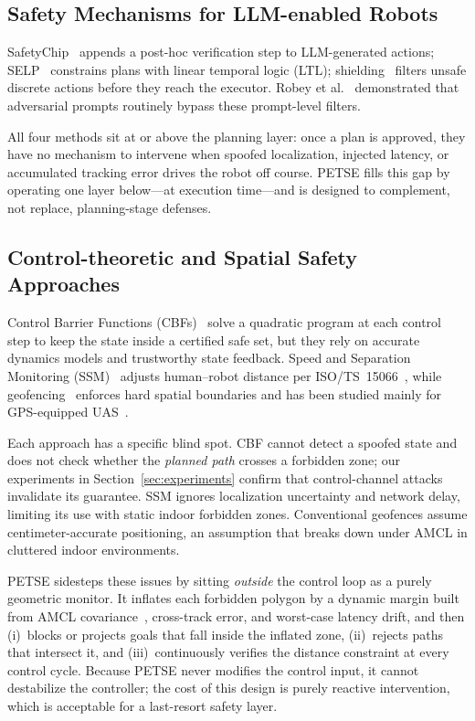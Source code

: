 \documentclass[journal,twoside,web]{ieeecolor}
\begin{document}
\subsection{Safety Mechanisms for LLM-enabled Robots}
SafetyChip~\cite{yang2024plug} appends a post-hoc verification step to LLM-generated actions; SELP~\cite{wu2025selp} constrains plans with linear temporal logic (LTL); shielding~\cite{alshiekh2018safe} filters unsafe discrete actions before they reach the executor. Robey et al.~\cite{robey2025jailbreaking} demonstrated that adversarial prompts routinely bypass these prompt-level filters.

All four methods sit at or above the planning layer: once a plan is approved, they have no mechanism to intervene when spoofed localization, injected latency, or accumulated tracking error drives the robot off course. PETSE fills this gap by operating one layer below---at execution time---and is designed to complement, not replace, planning-stage defenses.

\subsection{Control-theoretic and Spatial Safety Approaches}
Control Barrier Functions (CBFs)~\cite{ames2017control,ames2019control} solve a quadratic program at each control step to keep the state inside a certified safe set, but they rely on accurate dynamics models and trustworthy state feedback. Speed and Separation Monitoring (SSM)~\cite{iso2016robots,marvel2017implementing} adjusts human--robot distance per ISO/TS~15066~\cite{rosenstrauch2017safe}, while geofencing~\cite{stevens2021geofence,vagal2021new} enforces hard spatial boundaries and has been studied mainly for GPS-equipped UAS~\cite{villani2018survey}.

Each approach has a specific blind spot. CBF cannot detect a spoofed state and does not check whether the \emph{planned path} crosses a forbidden zone; our experiments in Section~\ref{sec:experiments} confirm that control-channel attacks invalidate its guarantee. SSM ignores localization uncertainty and network delay, limiting its use with static indoor forbidden zones. Conventional geofences assume centimeter-accurate positioning, an assumption that breaks down under AMCL in cluttered indoor environments.

PETSE sidesteps these issues by sitting \emph{outside} the control loop as a purely geometric monitor. It inflates each forbidden polygon by a dynamic margin built from AMCL covariance~\cite{fox1999monte,fox2003adapting}, cross-track error, and worst-case latency drift, and then (i)~blocks or projects goals that fall inside the inflated zone, (ii)~rejects paths that intersect it, and (iii)~continuously verifies the distance constraint at every control cycle. Because PETSE never modifies the control input, it cannot destabilize the controller; the cost of this design is purely reactive intervention, which is acceptable for a last-resort safety layer.
\end{document}
